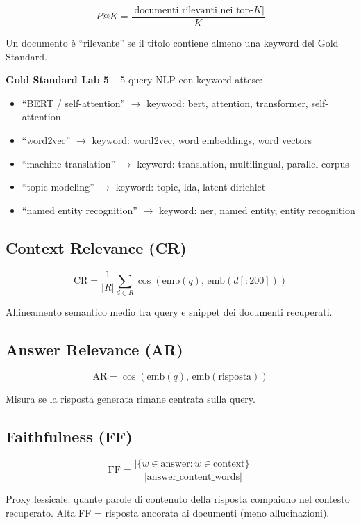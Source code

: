 \documentclass[12pt,a4paper]{article}
\begin{document}
\begin{formulabox}
\[
P@K = \frac{|\text{documenti rilevanti nei top-}K|}{K}
\]
\end{formulabox}
Un documento \`e ``rilevante'' se il titolo contiene almeno una keyword del Gold Standard.

\textbf{Gold Standard Lab 5} -- 5 query NLP con keyword attese:
\begin{itemize}
  \item ``BERT / self-attention'' $\to$ keyword: bert, attention, transformer, self-attention
  \item ``word2vec'' $\to$ keyword: word2vec, word embeddings, word vectors
  \item ``machine translation'' $\to$ keyword: translation, multilingual, parallel corpus
  \item ``topic modeling'' $\to$ keyword: topic, lda, latent dirichlet
  \item ``named entity recognition'' $\to$ keyword: ner, named entity, entity recognition
\end{itemize}

\subsection{Context Relevance (CR)}

\begin{formulabox}
\[
\text{CR} = \frac{1}{|R|} \sum_{d \in R} \cos\!\left(\text{emb}(q),\, \text{emb}(d[:200])\right)
\]
\end{formulabox}
Allineamento semantico medio tra query e snippet dei documenti recuperati.

\subsection{Answer Relevance (AR)}

\begin{formulabox}
\[
\text{AR} = \cos\!\left(\text{emb}(q),\, \text{emb}(\text{risposta})\right)
\]
\end{formulabox}
Misura se la risposta generata rimane centrata sulla query.

\subsection{Faithfulness (FF)}

\begin{formulabox}
\[
\text{FF} = \frac{|\{w \in \text{answer}: w \in \text{context}\}|}{|\text{answer\_content\_words}|}
\]
\end{formulabox}
Proxy lessicale: quante parole di contenuto della risposta compaiono nel contesto recuperato. Alta FF = risposta ancorata ai documenti (meno allucinazioni).
\end{document}
